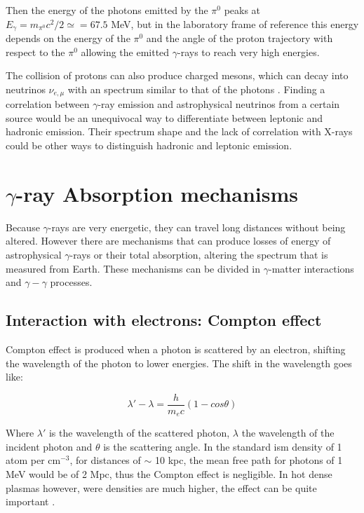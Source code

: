 \documentclass[main.tex]{subfiles}
\begin{document}
Then the energy of the photons emitted by the $\pi^{0}$ peaks at $E_{\gamma} = m_{\pi^{0}}c^{2}/2 \simeq = 67.5$ MeV, but in the laboratory frame of reference this energy depends on the energy of the $\pi^{0}$ and the angle of the proton trajectory with respect to the $\pi^{0}$ allowing the emitted $\gamma$-rays to reach very high energies.

The collision of protons can also produce charged mesons, which can decay into neutrinos $\nu_{e,\mu}$ with an spectrum similar to that of the photons \cite{2004VHECosmicGammaRadiation}. Finding a correlation between $\gamma$-ray emission and astrophysical neutrinos from a certain source would be an unequivocal way to differentiate between leptonic and hadronic emission. Their spectrum shape and the lack of correlation with X-rays could be other ways to distinguish hadronic and leptonic emission. 


\section{$\gamma$-ray Absorption mechanisms} \label{sec:absorption}
 
Because $\gamma$-rays are very energetic, they can travel long distances without being altered. However there are mechanisms that can produce losses of energy of astrophysical $\gamma$-rays or their total absorption, altering the spectrum that is measured from Earth. These mechanisms can be divided in $\gamma$-matter interactions and $\gamma-\gamma$ processes.

\subsection{Interaction with electrons: Compton effect}

Compton effect is produced when a photon is scattered by an electron, shifting the wavelength of the photon to lower energies. The shift in the wavelength goes like:

\begin{equation}
    \lambda '-\lambda = \frac{h}{m_e c}(1-cos\theta)    
\end{equation}

Where $\lambda'$ is the wavelength of the scattered photon, $\lambda$ the wavelength of the incident photon and $\theta$ is the scattering angle. In the standard \gls{ism} density of 1 atom per cm$^{-3}$, for distances of $\sim$ 10 kpc, the mean free path for photons of 1 MeV would be of 2 Mpc, thus the Compton effect is negligible. In hot dense plasmas however, were densities are much higher, the effect can be quite important \cite{1993MurthyGammaRay}.
\end{document}
